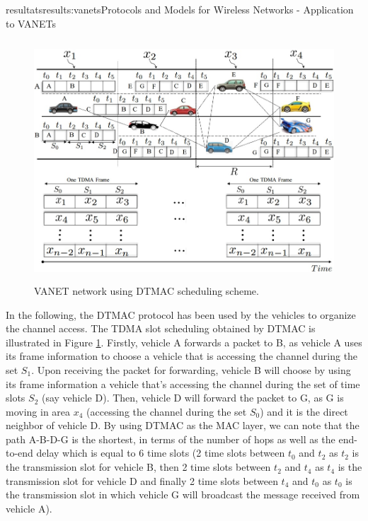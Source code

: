 \documentclass{ra2016}
\begin{document}
\begin{module}{resultats}{results:vanets}{Protocols and Models for Wireless Networks - Application to VANETs}
\begin{figure}[H]  %
  \begin{center}
 \includegraphics[height=9cm,width=15cm]{IMG/TRPM.jpg}
  \caption{VANET network using DTMAC scheduling scheme.}
 \label{figc:trpm}
  \end{center}
\end{figure}

In the following, the DTMAC protocol has been used by the vehicles to organize the channel access. The TDMA slot 
scheduling obtained by DTMAC is illustrated in Figure \ref{figc:trpm}. Firstly, vehicle A forwards a packet to B, as  vehicle A uses its frame 
information to choose a vehicle that is accessing the channel during the set $S_1$. Upon receiving the packet for forwarding, vehicle B 
will choose by using its frame information a vehicle that's accessing the channel during the set of time slots $S_2$ 
(say vehicle D). Then, vehicle D will forward the packet to G, as G is moving in area $x_4$ (accessing the channel during the 
set $S_0$) and it is the direct neighbor of vehicle D. By using DTMAC as the MAC layer, we can note that the path A-B-D-G is 
the shortest, in terms of the number of hops as well as the end-to-end delay which  is equal to 6 time slots  (2 time slots 
between $t_0$ and $t_2$ as $t_2$ is the transmission slot for vehicle B, then 2 time slots between $t_2$ and $t_4$ as $t_4$ is the 
transmission slot for vehicle D and finally 2 time slots between $t_4$ and $t_0$ as $t_0$ is the transmission slot in which vehicle 
G will broadcast the message received from  vehicle A). 



\end{module}
\end{document}
